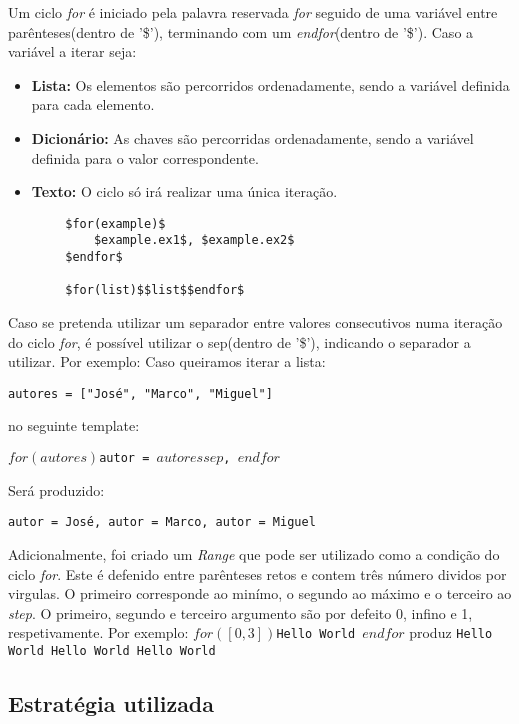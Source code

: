 \documentclass[../relatorio.tex]{subfiles}
\begin{document}
    Um ciclo \textit{for} é iniciado pela palavra reservada \textit{for}
    seguido de uma variável entre parênteses(dentro de '\$'), terminando 
    com um \textit{endfor}(dentro de '\$').
    Caso a variável a iterar seja:
    \begin{itemize}
        \item \textbf{Lista: }Os elementos são percorridos ordenadamente,
        sendo a variável definida para cada elemento.
        \item \textbf{Dicionário: }As chaves são percorridas ordenadamente,
        sendo a variável definida para o valor correspondente. 
        \item \textbf{Texto: }O ciclo só irá realizar uma única iteração.
    \end{itemize}

    \begin{verbatim}
        $for(example)$
            $example.ex1$, $example.ex2$
        $endfor$

        $for(list)$$list$$endfor$
    \end{verbatim}

    Caso se pretenda utilizar um separador entre valores consecutivos numa
    iteração do ciclo \textit{for}, é possível utilizar o sep(dentro de '\$'),
    indicando o separador a utilizar. Por exemplo:
    Caso queiramos iterar a lista:

    \texttt{autores = ["José", "Marco", "Miguel"]}

    no seguinte template:

    \texttt{$for(autores)$autor = $autores$$sep$, $endfor$}

    Será produzido:

    \texttt{autor = José, autor = Marco, autor = Miguel}

    Adicionalmente, foi criado um \textit{Range} que pode ser utilizado como a
    condição do ciclo \textit{for}. Este é defenido entre parênteses retos e 
    contem três número dividos por virgulas. O primeiro corresponde ao minímo, o segundo
    ao máximo e o terceiro ao \textit{step}. O primeiro, segundo e terceiro argumento são
    por defeito 0, infino e 1, respetivamente.
    Por exemplo:
    \texttt{$for([0, 3])$Hello World $endfor$}
    produz
    \texttt{Hello World Hello World Hello World }

    \subsection*{Estratégia utilizada}
\end{document}
